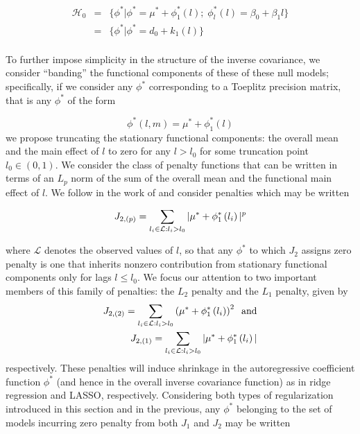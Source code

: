 \documentclass[12pt]{article}
\begin{document}
\begin{eqnarray*}
\mathcal{H}_0 &=& \lbrace \phi^* \vert \phi^* = \mu^* + \phi^*_1\left(l\right); \; \phi^*_l\left(l\right) = \beta_0 + \beta_1l \rbrace\\
&=& \lbrace \phi^* \vert \phi^* = d_0 + k_1\left(l\right) \rbrace\\
\end{eqnarray*}
\noindent

To further impose simplicity in the structure of the inverse covariance, we consider ``banding'' the functional components of these of these null models; specifically, if we consider any $\phi^*$ corresponding to a Toeplitz precision matrix, that is any $\phi^*$ of the form

\begin{equation}
\phi^*\left(l,m\right) = \mu^* + \phi^*_1\left(l\right)
\end{equation}
\noindent
we propose truncating the stationary functional components:  the overall mean and the main effect of $l$ to zero for any $l > l_0$ for some truncation point $l_0 \in \left(0,1\right)$. We consider the class of penalty functions that can be written in terms of an $L_p$ norm of the sum of the overall mean and the functional main effect of $l$. We follow in the work of \cite{huang2006covariance} and consider penalties which may be written

\begin{equation}
J_{2,\left(p\right)} = \sum_{\relsize{-2} l_i \in \mathcal{L}: l_i > l_0} \vert \mu^* + \phi^*_1\left(l_i\right) \vert^p  \label{bandedpenalty}
\end{equation}
\noindent

where $\mathcal{L}$ denotes the observed values of $l$, so that any $\phi^*$ to which $J_2$ assigns zero penalty is one that inherits nonzero contribution from stationary functional components only for lags $l \le l_0$. We focus our attention to two important members of this family of penalties: the $L_2$ penalty and the $L_1$ penalty, given by
\begin{eqnarray} \nonumber
 J_{2,\left(2\right)} = \sum_{\relsize{-2} l_i \in \mathcal{L}: l_i > l_0} \left( \mu^* + \phi^*_1\left(l_i\right) \right)^2 \label{L2penalty} \;\;\mbox{and}\\
 J_{2,\left(1\right)} = \sum_{\relsize{-2} l_i \in \mathcal{L}: l_i > l_0} \vert \mu^* + \phi^*_1\left(l_i\right) \vert \label{L1penalty}
 \end{eqnarray}\noindent
respectively. These penalties will induce shrinkage in the autoregressive coefficient function $\phi^*$ (and hence in the overall inverse covariance function) as in ridge regression and LASSO, respectively. Considering both types of regularization introduced in this section and in the previous, any $\phi^*$ belonging to the set of models incurring zero penalty from both $J_1$ and $J_2$ may be written
\end{document}
